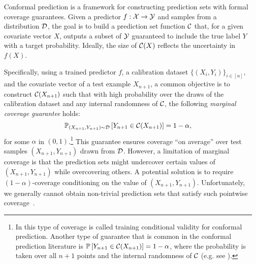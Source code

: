Conformal prediction \citep{AlgorithmicLearning2005, LW14, papadopoulos2002inductive} is a framework for constructing prediction sets with formal coverage guarantees. Given a predictor $f: \cal X \to \cal Y$ and samples from a distribution $\cal D$, the goal is to build a prediction set function ${\cal C}$ that, for a given covariate vector $X$, outputs a subset of $\cal Y$ guaranteed to include the true label $Y$ with a target probability. Ideally, the size of ${\cal C}(X)$ reflects the uncertainty in $f(X)$.


Specifically, using a trained predictor $f$, a calibration dataset $\{(X_i, Y_i)\}_{i \in [n]}$, and the covariate vector of a test example $X_{n+1}$, a common objective is to construct ${\cal C}(X_{n+1})$ such that with high probability over the draws of the calibration dataset and any internal randomness of ${\cal C}$, the following \emph{marginal coverage guarantee} holds:
\begin{equation}
\label{eq:marginal_guarantee}
\mathbb P_{(X_{n+1},Y_{n+1}) \sim \cal D} \left[ Y_{n+1} \in {\cal C}(X_{n+1}) \right] = 1-\alpha,
\end{equation}
for some $\alpha$ in $(0,1)$.\footnote{ In \citet{V12} this type of coverage is called training conditional validity for conformal prediction. Another type of guarantee that is common in the conformal prediction literature is $\mathbb {\mathbb{P}} \left[ Y_{n+1} \in {\cal C}(X_{n+1}) \right] = 1-\alpha$, where the probability is taken over all $n+1$ points and the internal randomness of ${\cal C}$ (e.g. see \citet{GCC2023}).}
This guarantee ensures coverage “on average” over test samples $(X_{n+1}, Y_{n+1})$ drawn from $\cal D$.
However, a limitation of marginal coverage is that the prediction sets might undercover certain values of $(X_{n+1}, Y_{n+1})$ while overcovering others. A potential solution is to require $(1-\alpha)$-coverage conditioning on the value of $(X_{n+1}, Y_{n+1})$. Unfortunately, we generally cannot obtain non-trivial prediction sets that satisfy such pointwise coverage~\citep{V12, LW14, BCRT21}.

